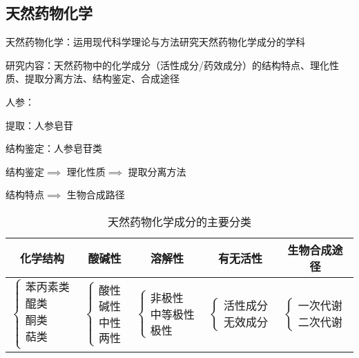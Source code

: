 \subsection{天然药物化学}%
\label{sub:天然药物化学}
\begin{defi}
    天然药物化学：运用现代科学理论与方法研究天然药物化学成分的学科
\end{defi}
研究内容：天然药物中的化学成分（活性成分/药效成分）的结构特点、理化性质、提取分离方法、结构鉴定、合成途径
\begin{eg}
    人参：

    提取：人参皂苷

    结构鉴定：人参皂苷类

    结构鉴定$\implies$ 理化性质$\implies$ 提取分离方法
    
    结构特点$\implies$ 生物合成路径
\end{eg}
\begin{table}[htpb]
    \centering
    \caption{天然药物化学成分的主要分类}
    \label{tab:天然药物化学成分的主要分类}
    \begin{tabular}{ccccc}
    \toprule
    化学结构 & 酸碱性 & 溶解性 & 有无活性 & 生物合成途径\\
    \midrule
    $\begin{cases}
        \text{苯丙素类}\\ 
        \text{醌类}\\ 
        \text{酮类}\\ 
        \text{萜类}\\ 
    \end{cases}$ & $\begin{cases}
        \text{酸性}\\ 
        \text{碱性}\\ 
        \text{中性}\\ 
        \text{两性}
    \end{cases}$ & $\begin{cases}
        \text{非极性}\\ 
        \text{中等极性}\\ 
        \text{极性}
    \end{cases}$ & $\begin{cases}
        \text{活性成分}\\ 
        \text{无效成分}
    \end{cases}$ & $\begin{cases}
        \text{一次代谢}\\ 
        \text{二次代谢}
    \end{cases}$ \\
    \bottomrule
    \end{tabular}
\end{table}
